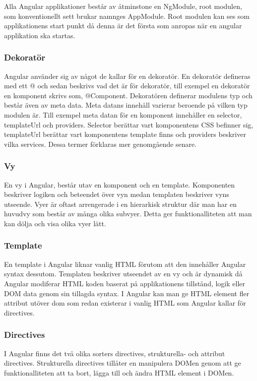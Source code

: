 Alla Angular applikationer består av åtminstone en NgModule, root modulen, som konventionellt sett brukar namnges AppModule.    Root modulen kan ses som applikationens start punkt då denna är det första som anropas när en angular applikation ska startas.


\subsubsection{Dekoratör}
Angular använder sig av något de kallar för en dekoratör. En dekoratör defineras med ett @ och sedan beskrivs vad det är för dekoratör, till exempel en dekoratör en komponent skrivs som, @Component. Dekoratören definerar modulens typ och består även av meta data. Meta datans innehåll varierar beroende på vilken typ modulen är. Till exempel meta datan för en komponent innehåller en selector, templateUrl och providers. Selector berättar vart komponentens CSS befinner sig, templateUrl berättar vart komponentens template finns och providers beskriver vilka services. Dessa termer förklaras mer genomgående senare.


\subsubsection{Vy}
En vy i Angular, består utav en komponent och en template. Komponenten beskriver logiken och beteendet över vyn medan templaten beskriver vyns utseende. Vyer är oftast arrengerade i en hierarkisk struktur där man har en huvudvy som består av många olika subvyer. Detta ger funktionalliteten att man kan dölja och visa olika vyer lätt. 

\subsubsection{Template}
En template i Angular liknar vanlig HTML förutom att den innehåller Angular syntax dessutom. Templaten beskriver utseendet av en vy och är dynamisk då Angular modiferar HTML koden baserat på applikationens tillstånd, logik eller DOM data genom sin tillagda syntax. I Angular kan man ge HTML element fler attribut utöver dom som redan existerar i vanlig HTML som Angular kallar för directives.

\subsubsection{Directives}
I Angular finns det två olika sorters directives, strukturella- och attribut directives. Strukturella directives tillåter en manipulera DOMen genom att ge funktionalliteten att ta bort, lägga till och ändra HTML element i DOMen. 

